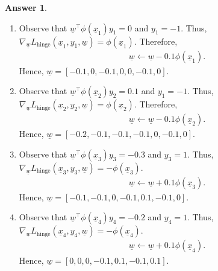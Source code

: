 \documentclass{article}
\theoremstyle{definition}
\newtheorem*{answer}{Answer}
\begin{document}
\begin{question}[start=0]
\begin{answer}
			\begin{enumerate}[label=\textbf{Step \arabic* (datapoint $\underline{x}_\arabic*$):}, itemindent=3.5cm]
				\item Observe that $\underline{w}^\top\phi(\underline{x}_1)y_1=0$ and $y_1=-1$. Thus,  $\nabla_{\underline{w}} L_{\text{hinge}}(\underline{x}_1, y_1, \underline{w}) = \phi(\underline{x}_1)$. Therefore, 
				\begin{align*}
						&\underline{w} \leftarrow \underline{w} - 0.1 \phi(\underline{x}_1).
					\end{align*}
				Hence, $\underline{w}=[-0.1, 0, -0.1, 0, 0, -0.1, 0]$.
				\item Observe that $\underline{w}^\top\phi(\underline{x}_2)y_2=0.1$ and $y_1=-1$. Thus, $\nabla_{\underline{w}} L_{\text{hinge}}(\underline{x}_2, y_2, \underline{w}) = \phi(\underline{x}_2)$. Therefore,
				\begin{align*}
					&\underline{w} \leftarrow \underline{w} - 0.1 \phi(\underline{x}_2).
				\end{align*}
				Hence, $\underline{w}=[-0.2, -0.1, -0.1, -0.1, 0, -0.1, 0]$.
				\item Observe that $\underline{w}^\top\phi(\underline{x}_3)y_3= -0.3$ and $y_3=1$. Thus, $\nabla_{\underline{w}} L_{\text{hinge}}(\underline{x}_3, y_3, \underline{w}) = -\phi(\underline{x}_3)$. \begin{align*}
						&\underline{w} \leftarrow \underline{w} + 0.1\phi(\underline{x}_3).
					\end{align*}
				Hence, $\underline{w}=[-0.1, -0.1, 0, -0.1, 0.1, -0.1, 0]$.
				\item Observe that $\underline{w}^\top\phi(\underline{x}_4)y_4= -0.2$ and $y_4=1$. Thus, $\nabla_{\underline{w}} L_{\text{hinge}}(\underline{x}_4, y_4, \underline{w}) = -\phi(\underline{x}_4)$. \begin{align*}
						&\underline{w} \leftarrow \underline{w} + 0.1 \phi(\underline{x}_4).
					\end{align*}
				Hence, $\underline{w}=[0, 0, 0, -0.1, 0.1, -0.1, 0.1]$.
			\end{enumerate}
			\end{answer}


\end{question}
\end{document}
